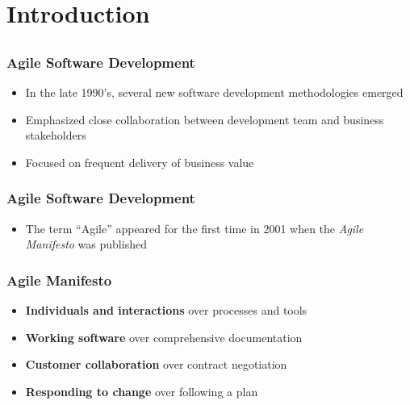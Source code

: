\section{Introduction}
\subsection{}

\begin{frame}
	\frametitle{Agile Software Development}
	\begin{itemize}
		\setlength\itemsep{0.7em}
		\item In the late 1990’s, several new software development methodologies emerged
		\item Emphasized close collaboration between development team and business stakeholders
		\item Focused on frequent delivery of business value
	\end{itemize}
\end{frame}

\begin{frame}
	\frametitle{Agile Software Development}
	\begin{itemize}
		\item The term ``Agile'' appeared for the first time in 2001 when the \textit{Agile Manifesto} was published
	\end{itemize}
\end{frame}

\begin{frame}
	\frametitle{Agile Manifesto}
	\begin{itemize}
		\setlength\itemsep{0.7em}
		\item \textbf{Individuals and interactions} over processes and tools
		\item \textbf{Working software} over comprehensive documentation
		\item \textbf{Customer collaboration} over contract negotiation
		\item \textbf{Responding to change} over following a plan
	\end{itemize}
\end{frame}

